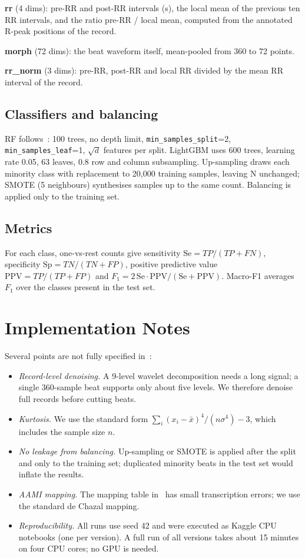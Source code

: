 \documentclass[journal]{IEEEtran}
\begin{document}
\textbf{rr} (4 dims): pre-RR and post-RR intervals (s), the local mean of the previous ten RR intervals, and the ratio pre-RR / local mean, computed from the annotated R-peak positions of the record.

\textbf{morph} (72 dims): the beat waveform itself, mean-pooled from 360 to 72 points.

\textbf{rr\_norm} (3 dims): pre-RR, post-RR and local RR divided by the mean RR interval of the record.

\subsection{Classifiers and balancing}
RF follows~\cite{subba2024}: 100 trees, no depth limit, \texttt{min\_samples\_split}=2, \texttt{min\_samples\_leaf}=1, $\sqrt{d}$ features per split. LightGBM uses 600 trees, learning rate 0.05, 63 leaves, 0.8 row and column subsampling. Up-sampling draws each minority class with replacement to 20{,}000 training samples, leaving N unchanged; SMOTE (5 neighbours) synthesises samples up to the same count. Balancing is applied only to the training set.

\subsection{Metrics}
For each class, one-vs-rest counts give sensitivity $\mathrm{Se}=TP/(TP+FN)$, specificity $\mathrm{Sp}=TN/(TN+FP)$, positive predictive value $\mathrm{PPV}=TP/(TP+FP)$ and $F_1 = 2\,\mathrm{Se}\cdot\mathrm{PPV}/(\mathrm{Se}+\mathrm{PPV})$. Macro-F1 averages $F_1$ over the classes present in the test set.

\section{Implementation Notes}\label{sec:impl}
Several points are not fully specified in~\cite{subba2024}:
\begin{itemize}
\item \emph{Record-level denoising.} A 9-level wavelet decomposition needs a long signal; a single 360-sample beat supports only about five levels. We therefore denoise full records before cutting beats.
\item \emph{Kurtosis.} We use the standard form $\sum_i (x_i-\bar x)^4 / (n\sigma^4) - 3$, which includes the sample size $n$.
\item \emph{No leakage from balancing.} Up-sampling or SMOTE is applied after the split and only to the training set; duplicated minority beats in the test set would inflate the results.
\item \emph{AAMI mapping.} The mapping table in~\cite{subba2024} has small transcription errors; we use the standard de Chazal mapping.
\item \emph{Reproducibility.} All runs use seed 42 and were executed as Kaggle CPU notebooks (one per version). A full run of all versions takes about 15 minutes on four CPU cores; no GPU is needed.
\end{itemize}
\end{document}
